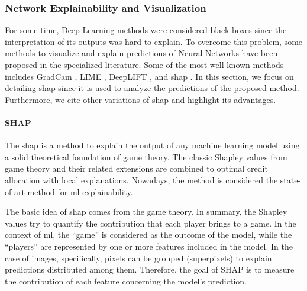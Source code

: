 



\subsubsection{Network Explainability and Visualization}

For some time, Deep Learning methods were considered black boxes since the interpretation of its outputs was hard to explain. To overcome this problem, some methods to visualize and explain predictions of Neural Networks have been proposed in the specialized literature. Some of the most well-known methods includes GradCam \citep{gradcam}, LIME \citep{lime}, DeepLIFT \citep{deeplift_old, deeplift_new}, and \acs{shap} \citep{shap2018}. In this section, we focus on detailing \acs{shap} since it is used to analyze the predictions of the proposed method. Furthermore, we cite other variations of \acs{shap} and highlight its advantages.

\paragraph{SHAP}

The \acf{shap} is a method to explain the output of any machine learning model using a solid theoretical foundation of game theory. The classic Shapley values \citep{shapley1953value} from game theory and their related extensions are combined to optimal credit allocation with local explanations. Nowadays, the method is considered the state-of-art method for \acs{ml} explainability.

The basic idea of \acs{shap} comes from the game theory. In summary, the Shapley values try to quantify the contribution that each player brings to a game. In the context of \acl{ml}, the ``game'' is considered as the outcome of the model, while the ``players'' are represented by one or more features included in the model. In the case of images, specifically, pixels can be grouped (superpixels) to explain predictions distributed among them. Therefore, the goal of SHAP is to measure the contribution of each feature concerning the model's prediction.

